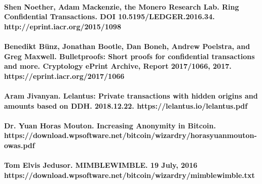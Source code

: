 \documentclass{article}
\begin{document}
\paragraph{Shen Noether, Adam Mackenzie, the Monero Research Lab. Ring Confidential Transactions. DOI 10.5195/LEDGER.2016.34. http://eprint.iacr.org/2015/1098}

\paragraph{Benedikt Bünz, Jonathan Bootle, Dan Boneh, Andrew Poelstra, and Greg Maxwell. Bulletproofs: Short proofs for confidential transactions and more. Cryptology ePrint Archive, Report 2017/1066, 2017. https://eprint.iacr.org/2017/1066}

\paragraph{Aram Jivanyan. Lelantus: Private transactions with hidden origins and amounts based on DDH. 2018.12.22. https://lelantus.io/lelantus.pdf}

\paragraph{Dr. Yuan Horas Mouton. Increasing Anonymity in Bitcoin. https://download.wpsoftware.net/bitcoin/wizardry/horasyuanmouton-owas.pdf}

\paragraph{Tom Elvis Jedusor. MIMBLEWIMBLE. 19 July, 2016 https://download.wpsoftware.net/bitcoin/wizardry/mimblewimble.txt}
\end{document}
